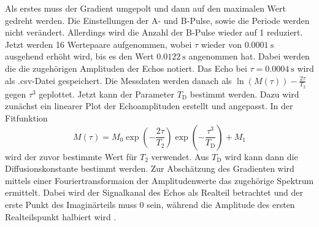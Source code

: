 Als erstes muss der Gradient umgepolt und dann auf den maximalen Wert gedreht werden.
Die Einstellungen der A- und B-Pulse, sowie die Periode werden nicht verändert. 
Allerdings wird die Anzahl der B-Pulse wieder auf 1 reduziert.
Jetzt werden 16 Wertepaare aufgenommen, wobei $\tau$ wieder von 
$\SI{0.0001}{\second}$ ausgehend erhöht wird, bis es den Wert $\SI{0.0122}{\second}$
angenommen hat. Dabei werden die die zugehörigen Amplituden der Echos notiert.
Das Echo bei $\tau = \SI{0.0004}{\second}$ wird als .csv-Datei gespeichert.
Die Messdaten werden danach als $\ln{(M(\tau))}- \frac{2\tau}{T_{\text{2}}}$
gegen $\tau^3$ geplottet.
Jetzt kann der Parameter $T_{\text{D}}$ bestimmt werden. Dazu wird zunächst ein linearer 
Plot der Echoamplituden erstellt und angepasst. In der Fitfunktion 
\begin{equation}
    M(\tau) = M_{\text{0}} \exp{\left( -\frac{2\tau}{T_{\text{2}}} \right)} \exp{\left( -\frac{\tau^3}{T_{\text{D}}} \right)} + M_{\text{1}}
    \label{fit2}
\end{equation}
wird der
zuvor bestimmte Wert für $T_{\text{2}}$ verwendet. Aus $T_{\text{D}}$ wird kann 
dann die Diffusionskonstante bestimmt werden.
Zur Abschätzung des Gradienten wird mittels einer Fouriertransformaion der 
Amplitudenwerte das zugehörige Spektrum ermittelt. Dabei wird der Signalkanal des 
Echos als Realteil betrachtet und der erste Punkt des Imaginärteils muss 0 sein,
während die Amplitude des ersten Realteilspunkt halbiert wird \cite{anleitung}. 
